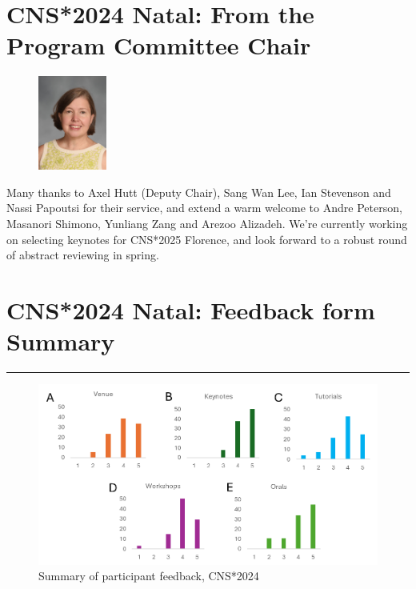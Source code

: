 \documentclass[11pt,a4paper,oneside]{article}
\begin{document}
\clearpage
\clearpage
\clearpage
\section*{CNS*2024 Natal: From the Program Committee Chair}%
\begin{figure}
  \includegraphics[width=0.2\textwidth]{images/Haas}
\end{figure}

Many thanks to Axel Hutt (Deputy Chair), Sang Wan Lee, Ian Stevenson and Nassi Papoutsi for their service, and extend a warm welcome to Andre Peterson, Masanori Shimono, Yunliang Zang and Arezoo Alizadeh.
We're currently working on selecting keynotes for CNS*2025 Florence, and look forward to a robust round of abstract reviewing in spring.

\clearpage
\clearpage



\clearpage
\section*{CNS*2024 Natal: Feedback form Summary}%
\rule{\textwidth}{0.4pt}
\begin{figure}[h]
  \centering
  \includegraphics[width=\textwidth]{images/cns2024-feedback-form-summary}
  \caption{Summary of participant feedback, CNS*2024}%
  \label{fig:cns2024-summary}
\end{figure}
\end{document}
